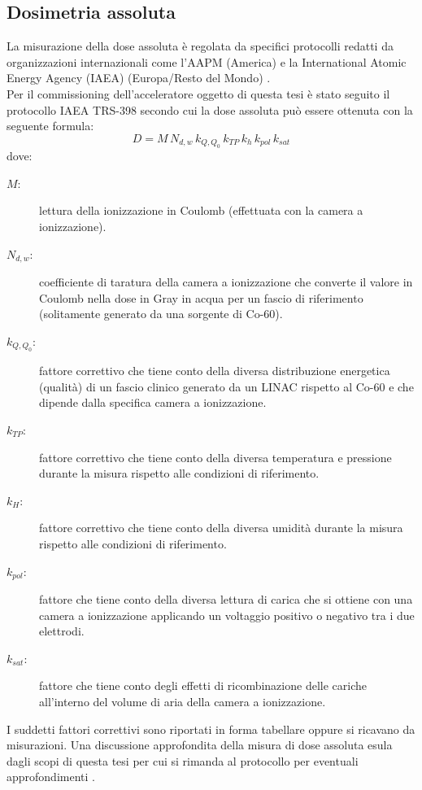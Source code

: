 \subsection{Dosimetria assoluta}
\label{sec:dose_ass}
La misurazione della dose assoluta è regolata da specifici protocolli redatti da organizzazioni internazionali come l'AAPM (America) \cite{Almond1999} e la International Atomic Energy Agency (IAEA) (Europa/Resto del Mondo) \cite{Andreo2006}.\\
Per il commissioning dell'acceleratore oggetto di questa tesi è stato seguito il protocollo IAEA TRS-398 secondo cui la dose assoluta può essere ottenuta con la seguente formula:
\begin{equation}
D = M\,N_{d,w}\,k_{Q,Q_0}\,k_{TP}\,k_h\,k_{pol}\,k_{sat}
\end{equation}
dove:
\begin{description}
\item[$M:$] lettura della ionizzazione in Coulomb (effettuata con la camera a ionizzazione).
\item[$N_{d,w}:$] coefficiente di taratura della camera a ionizzazione che converte il valore in Coulomb nella dose in Gray in acqua per un fascio di riferimento (solitamente generato da una sorgente di Co-60).
\item[$k_{Q,Q_0}:$] fattore correttivo che tiene conto della diversa distribuzione energetica (qualità) di un fascio clinico generato da un LINAC rispetto al Co-60 e che dipende dalla specifica camera a ionizzazione.
\item[$k_{TP}:$] fattore correttivo che tiene conto della diversa temperatura e pressione durante la misura rispetto alle condizioni di riferimento.
\item[$k_{H}:$] fattore correttivo che tiene conto della diversa umidità durante la misura rispetto alle condizioni di riferimento.
\item[$k_{pol}:$] fattore che tiene conto della diversa lettura di carica che si ottiene con una camera a ionizzazione applicando un voltaggio positivo o negativo tra i due elettrodi.
\item[$k_{sat}:$] fattore che tiene conto degli effetti di ricombinazione delle cariche all'interno del volume di aria della camera a ionizzazione.
\end{description}
I suddetti fattori correttivi sono riportati in forma tabellare oppure si ricavano da misurazioni. Una discussione approfondita della misura di dose assoluta esula dagli scopi di questa tesi per cui si rimanda al protocollo per eventuali approfondimenti \cite{Andreo2006}.


